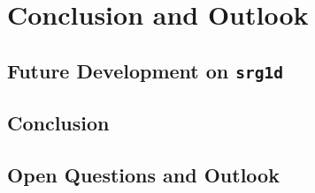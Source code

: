 \chapter{Conclusion and Outlook}

\section{Future Development on \texttt{srg1d}}

\section{Conclusion}

\section{Open Questions and Outlook}
